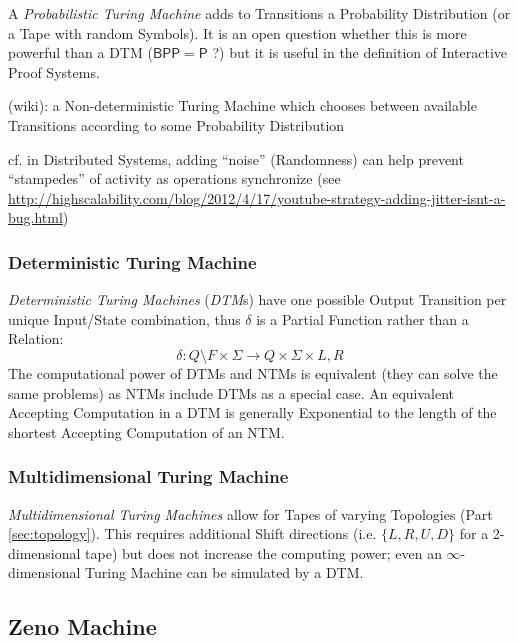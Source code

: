 A \emph{Probabilistic Turing Machine} adds to Transitions a Probability
Distribution (or a Tape with random Symbols). It is an open question whether
this is more powerful than a DTM ($\mathsf{BPP}=\mathsf{P}$ ?) but it is useful
in the definition of Interactive Proof Systems. %

(wiki): a Non-deterministic Turing Machine which chooses between available
Transitions according to some Probability Distribution

cf. in Distributed Systems, adding ``noise'' (Randomness) can help prevent
``stampedes'' of activity as operations synchronize (see
\url{http://highscalability.com/blog/2012/4/17/youtube-strategy-adding-jitter-isnt-a-bug.html})



\subsubsection{Deterministic Turing Machine}
\label{sec:deterministic_turing_machine}

\emph{Deterministic Turing Machines} (\emph{DTM}s) have one possible
Output Transition per unique Input/State combination, thus $\delta$ is
a Partial Function rather than a Relation:
\[
  \delta : Q \setminus F \times \Sigma \rightarrow Q \times
  \Sigma \times {L,R}
\]
The computational power of DTMs and NTMs is equivalent (they can solve
the same problems) as NTMs include DTMs as a special case. An
equivalent Accepting Computation in a DTM is generally Exponential to
the length of the shortest Accepting Computation of an NTM.



\subsubsection{Multidimensional Turing Machine}
\label{sec:multidimensional_turing_machine}

\emph{Multidimensional Turing Machines} allow for Tapes of varying
Topologies (Part \ref{sec:topology}). This requires additional Shift
directions (i.e. $\{L, R, U, D\}$ for a 2-dimensional tape) but does
not increase the computing power; even an $\infty$-dimensional Turing
Machine can be simulated by a DTM.



\subsection{Zeno Machine}\label{sec:zeno_machine}

